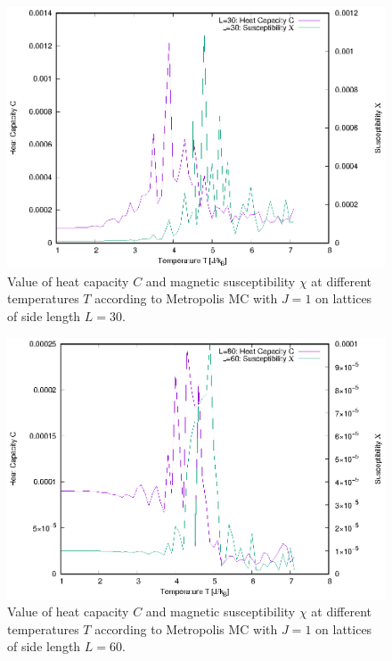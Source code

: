 \documentclass[11pt,a4paper]{article}
\begin{document}
\begin{figure}[ht]
\begin{center}
\includegraphics[scale=1.4]{figure2.eps} 
\end{center}
\caption{Value of heat capacity $C$ and magnetic susceptibility $\chi$ at different temperatures $T$ according to Metropolis MC with $J=1$ on lattices of side length $L=30$.}
\label{fig:2}
\end{figure}

\begin{figure}[ht]
\begin{center}
\includegraphics[scale=1.4]{figure3.eps} 
\end{center}
\caption{Value of heat capacity $C$ and magnetic susceptibility $\chi$ at different temperatures $T$ according to Metropolis MC with $J=1$ on lattices of side length $L=60$.}
\label{fig:3}
\end{figure}
\end{document}

